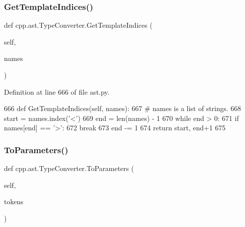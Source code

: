 \mbox{\label{classcpp_1_1ast_1_1TypeConverter_a7b5244be5a0caedd769ae866f8a182aa}} 
\subsubsection{\texorpdfstring{Get\+Template\+Indices()}{GetTemplateIndices()}}
{\footnotesize\ttfamily def cpp.\+ast.\+Type\+Converter.\+Get\+Template\+Indices (\begin{DoxyParamCaption}\item[{}]{self,  }\item[{}]{names }\end{DoxyParamCaption})}



Definition at line 666 of file ast.\+py.


\begin{DoxyCode}
666     \textcolor{keyword}{def }GetTemplateIndices(self, names):
667         \textcolor{comment}{# names is a list of strings.}
668         start = names.index(\textcolor{stringliteral}{'<'})
669         end = len(names) - 1
670         \textcolor{keywordflow}{while} end > 0:
671             \textcolor{keywordflow}{if} names[end] == \textcolor{stringliteral}{'>'}:
672                 \textcolor{keywordflow}{break}
673             end -= 1
674         \textcolor{keywordflow}{return} start, end+1
675 
\end{DoxyCode}
\mbox{\label{classcpp_1_1ast_1_1TypeConverter_aeaf27fb1890f65d7216703df610b46d5}} 
\subsubsection{\texorpdfstring{To\+Parameters()}{ToParameters()}}
{\footnotesize\ttfamily def cpp.\+ast.\+Type\+Converter.\+To\+Parameters (\begin{DoxyParamCaption}\item[{}]{self,  }\item[{}]{tokens }\end{DoxyParamCaption})}



